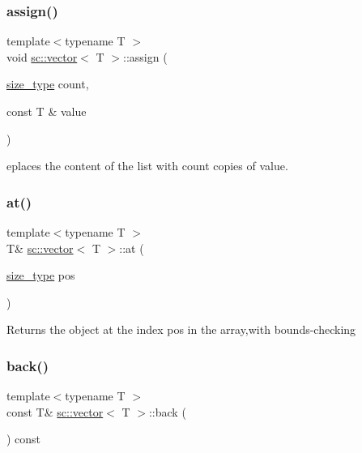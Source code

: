 \subsubsection{\texorpdfstring{assign()}{assign()}}
{\footnotesize\ttfamily template$<$typename T $>$ \\
void \hyperlink{classsc_1_1vector}{sc\+::vector}$<$ T $>$\+::assign (\begin{DoxyParamCaption}\item[{\hyperlink{classsc_1_1vector_a48bf37ba1a6d0c13504414d86e27c399}{size\+\_\+type}}]{count,  }\item[{const T \&}]{value }\end{DoxyParamCaption})\hspace{0.3cm}{\ttfamily [inline]}}

eplaces the content of the list with count copies of value. \mbox{\label{classsc_1_1vector_ab6fc47c9994c531ff8d0a0b46fe422f8}} 
\subsubsection{\texorpdfstring{at()}{at()}}
{\footnotesize\ttfamily template$<$typename T $>$ \\
T\& \hyperlink{classsc_1_1vector}{sc\+::vector}$<$ T $>$\+::at (\begin{DoxyParamCaption}\item[{\hyperlink{classsc_1_1vector_a48bf37ba1a6d0c13504414d86e27c399}{size\+\_\+type}}]{pos }\end{DoxyParamCaption})\hspace{0.3cm}{\ttfamily [inline]}}

Returns the object at the index pos in the array,with bounds-\/checking \mbox{\label{classsc_1_1vector_a90e25706d3a6e4b72db0f5ad35a63abf}} 
\subsubsection{\texorpdfstring{back()}{back()}}
{\footnotesize\ttfamily template$<$typename T $>$ \\
const T\& \hyperlink{classsc_1_1vector}{sc\+::vector}$<$ T $>$\+::back (\begin{DoxyParamCaption}{ }\end{DoxyParamCaption}) const\hspace{0.3cm}{\ttfamily [inline]}}

